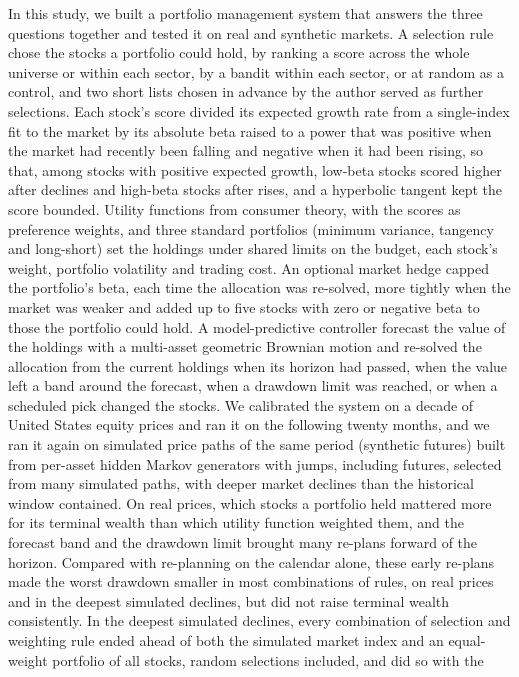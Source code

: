 In this study, we built a portfolio management system that answers the three questions together and tested it on
real and synthetic markets. A selection rule chose the stocks a portfolio could hold, by ranking a score across the
whole universe or within each sector, by a bandit within each sector, or at random as a control, and two short lists
chosen in advance by the author served as further selections. Each stock's score divided its expected growth rate
from a single-index fit to the market by its absolute beta raised to a power that was positive when the market had
recently been falling and negative when it had been rising, so that, among stocks with positive expected growth,
low-beta stocks scored higher after declines and high-beta stocks after rises, and a hyperbolic tangent kept the score bounded. Utility functions from
consumer theory, with the scores as preference weights, and three standard portfolios (minimum variance, tangency
and long-short) set the holdings under shared limits on the budget, each stock's weight, portfolio
volatility and trading cost. An optional market hedge capped the portfolio's beta, each time the allocation was
re-solved, more tightly when the market was weaker and added up to five stocks with zero or negative beta to those the portfolio could hold. A model-predictive controller forecast the value of the
holdings with a multi-asset geometric Brownian motion and re-solved the allocation from the current holdings when
its horizon had passed, when the value left a band around the forecast, when a drawdown limit was reached, or when
a scheduled pick changed the stocks. We
calibrated the system on a decade of United States equity prices and ran it on the following twenty months, and we
ran it again on simulated price paths of the same period (synthetic futures) built from per-asset hidden Markov
generators with jumps, including futures, selected from many simulated paths, with deeper market declines than the
historical window contained. On real prices, which stocks a portfolio held mattered more for its terminal wealth than which utility
function weighted them, and the forecast band and the drawdown limit brought many re-plans forward of the horizon.
Compared with re-planning on the calendar alone, these early re-plans made the worst drawdown smaller in most
combinations of rules, on real prices and in the deepest simulated declines, but did not raise terminal wealth
consistently.
In the deepest simulated declines, every combination of selection and weighting rule ended ahead of both the
simulated market index and an equal-weight portfolio of all stocks, random selections included, and did so with the

